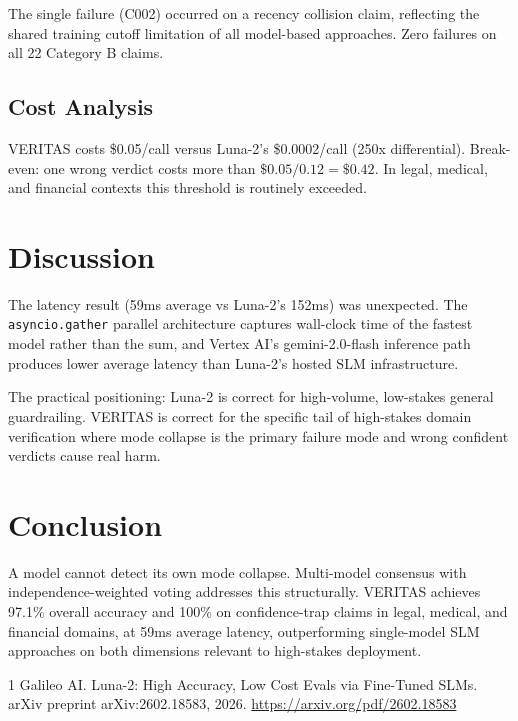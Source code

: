\documentclass[11pt]{article}
\begin{document}
The single failure (C002) occurred on a recency collision claim,
reflecting the shared training cutoff limitation of all model-based
approaches. Zero failures on all 22 Category B claims.

\subsection{Cost Analysis}

VERITAS costs \$0.05/call versus Luna-2's \$0.0002/call (250x differential).
Break-even: one wrong verdict costs more than $\$0.05 / 0.12 = \$0.42$.
In legal, medical, and financial contexts this threshold is routinely exceeded.

\section{Discussion}

The latency result (59ms average vs Luna-2's 152ms) was unexpected.
The \texttt{asyncio.gather} parallel architecture captures wall-clock
time of the fastest model rather than the sum, and Vertex AI's
gemini-2.0-flash inference path produces lower average latency
than Luna-2's hosted SLM infrastructure.

The practical positioning: Luna-2 is correct for high-volume,
low-stakes general guardrailing. VERITAS is correct for the specific
tail of high-stakes domain verification where mode collapse is the
primary failure mode and wrong confident verdicts cause real harm.

\section{Conclusion}

A model cannot detect its own mode collapse. Multi-model consensus
with independence-weighted voting addresses this structurally.
VERITAS achieves 97.1\% overall accuracy and 100\% on confidence-trap
claims in legal, medical, and financial domains, at 59ms average latency,
outperforming single-model SLM approaches on both dimensions relevant
to high-stakes deployment.


\begin{thebibliography}{1}
Galileo AI.
\newblock Luna-2: High Accuracy, Low Cost Evals via Fine-Tuned SLMs.
\newblock arXiv preprint arXiv:2602.18583, 2026.
\newblock \url{https://arxiv.org/pdf/2602.18583}
\end{thebibliography}
\end{document}
